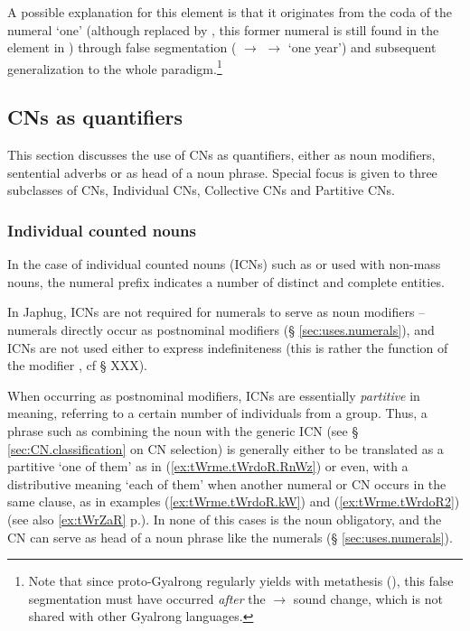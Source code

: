 A possible explanation for this  element is that it originates from the coda of the numeral `one' (although replaced by , this former numeral is still found in the element  in ) through false segmentation ( $\rightarrow$  $\rightarrow$  `one year') and subsequent generalization to the whole paradigm.\footnote{Note that since proto-Gyalrong  regularly yields  with metathesis (\citealt[272]{jacques04these}), this false segmentation must have occurred \textit{after} the  $\rightarrow$ sound change, which is not shared with other Gyalrong languages. }


\subsection{CNs as quantifiers} \label{sec:CN.quantifier}
This section discusses the use of CNs as quantifiers, either as noun modifiers, sentential adverbs or as head of a noun phrase. Special focus is given to three subclasses of CNs, Individual CNs, Collective CNs and Partitive CNs.

\subsubsection{Individual counted nouns} \label{sec:ICN}
In the case of individual counted nouns (ICNs) such as  or  used with non-mass nouns, the numeral prefix indicates a number of distinct and complete entities.

In Japhug, ICNs are not required for numerals to serve as noun modifiers -- numerals  directly occur as postnominal modifiers (§ \ref{sec:uses.numerals}), and ICNs are not used either to express indefiniteness (this is rather the function of the modifier , cf  § XXX).

When occurring as postnominal modifiers, ICNs are essentially \textit{partitive} in meaning, referring to a certain number of individuals from a group. Thus, a phrase such as   combining the noun  with the generic ICN  (see §  \ref{sec:CN.classification} on CN selection) is generally either to be translated as a partitive `one of them'  as in (\ref{ex:tWrme.tWrdoR.RnWz}) or even, with a distributive meaning  `each of them' when another numeral or CN occurs in the same clause, as in examples (\ref{ex:tWrme.tWrdoR.kW}) and (\ref{ex:tWrme.tWrdoR2}) (see also \ref{ex:tWrZaR} p.\pageref{ex:tWrZaR}). In none of this cases is the noun   obligatory, and the CN can serve as head of a noun phrase like the numerals (§ \ref{sec:uses.numerals}).

